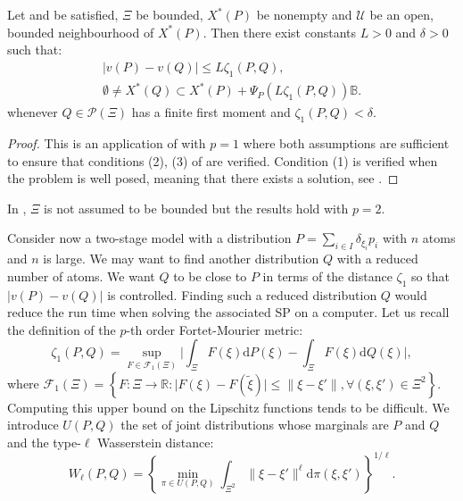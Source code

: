 \documentclass{amsart}
\newcommand{\RR}{\mathbb{R}}
\begin{document}
\begin{corollary}
    Let  and  be satisfied, $\Xi$ be bounded, $X^*\left(P\right)$ be nonempty and $\mathcal{U}$ be an open, bounded neighbourhood of $X^*\left(P\right).$ Then there exist constants $L>0$ and $\delta >0$ such that:
    \begin{align*}
        \lvert v\left(P\right)-v\left(Q\right)\rvert \leq L\zeta_1\left(P,Q\right), \\
        \emptyset \ne X^*\left(Q\right)\subset X^*\left(P\right)+\Psi_P\left(L\zeta_1\left(P,Q\right)\right)\mathbb{B}.
    \end{align*}
    whenever $Q\in\mathcal{P}\left(\Xi\right)$ has a finite first moment and $\zeta_1\left(P,Q\right)<\delta$.
\end{corollary}
\begin{proof}
    This is an application of  with $p=1$ where both assumptions are sufficient to ensure that conditions (2), (3) of  are verified. Condition (1) is verified when the problem is well posed, meaning that there exists a solution, see \cite[Proposition 22]{romisch_stability_2003}.
\end{proof}
\begin{remark}
    In \cite{romisch_stability_2003}, $\Xi$ is not assumed to be bounded but the results hold with $p=2$.
\end{remark}
Consider now a two-stage model with a distribution $P=\sum_{i\in I}\delta_{\xi_i}p_i$ with $n$ atoms and $n$ is large. We may want to find another distribution $Q$ with a reduced number of atoms. We want $Q$ to be close to $P$ in terms of the distance $\zeta_1$ so that $\lvert v\left(P\right)-v\left(Q\right)\rvert$ is controlled. Finding such a reduced distribution $Q$ would reduce the run time when solving the associated SP on a computer. Let us recall the definition of the $p$-th order Fortet-Mourier metric:
$$
\zeta_1\left(P,Q\right)=\sup_{F\in\mathcal{F}_1\left(\Xi\right)}\lvert \int_\Xi F\left(\xi\right)\text{d}P\left(\xi\right)-\int_\Xi F\left(\xi\right)\text{d}Q\left(\xi\right)\rvert,
$$
where $\mathcal{F}_1\left(\Xi\right)=\left\{F:\Xi\to \RR: \lvert F\left(\xi\right)-F\left(\tilde{\xi}\right)\rvert \leq \lVert\xi-\xi'\rVert, \forall \left(\xi,\xi'\right)\in \Xi^2 \right\}$. Computing this upper bound on the Lipschitz functions tends to be difficult. We introduce $U\left(P,Q\right)$ the set of joint distributions whose marginals are $P$ and $Q$ and the type-$\ell$ Wasserstein distance: $$
W_\ell\left(P,Q\right) = \left\{\min_{\pi\in U\left(P,Q\right)}\int_{\Xi^2}\lVert \xi-\xi'\rVert^\ell \text{d}\pi\left(\xi,\xi'\right)\right\}^{1/\ell}.$$
\end{document}
